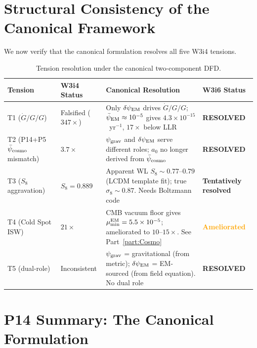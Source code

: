 \documentclass[11pt]{article}
\newcommand{\ee}[1]{\times 10^{#1}}
\newcommand{\psigrav}{\psi_{\rm grav}}
\newcommand{\dpsiEM}{\delta\psi_{\rm EM}}
\newcommand{\psicosmo}{\bar{\psi}_{\rm cosmo}}
\newcommand{\psiEM}{\bar{\psi}_{\rm EM}}
\newcommand{\Gdot}{\dot{G}/G}
\newcommand{\aM}{a_0}
\newcommand{\mumin}{\mu_{\rm min}}
\begin{document}
\section{Structural Consistency of the Canonical Framework}
\label{sec:consistency}

We now verify that the canonical formulation resolves all five W3i4 tensions.

\begin{table}[H]
\centering
\caption{Tension resolution under the canonical two-component DFD.}
\label{tab:tensions}
\begin{tabular}{llp{6cm}l}
\toprule
\textbf{Tension} & \textbf{W3i4 Status} & \textbf{Canonical Resolution} & \textbf{W3i6 Status} \\
\midrule
T1 ($\Gdot/G$) & Falsified ($347\times$) &
  Only $\dpsiEM$ drives $\Gdot/G$; $\psiEM \approx 10^{-5}$
  gives $4.3\ee{-15}$~yr$^{-1}$, $17\times$ below LLR &
  \textcolor{green!50!black}{\textbf{RESOLVED}} \\
\addlinespace
T2 (P14+P5 $\psicosmo$ mismatch) & $3.7\times$ &
  $\psigrav$ and $\dpsiEM$ serve different roles;
  $\aM$ no longer derived from $\psicosmo$ &
  \textcolor{green!50!black}{\textbf{RESOLVED}} \\
\addlinespace
T3 ($S_8$ aggravation) & $S_8 = 0.889$ &
  Apparent WL $S_8 \sim 0.77$--$0.79$ (LCDM template fit);
  true $\sigma_8 \sim 0.87$. Needs Boltzmann code &
  \textcolor{green!50!black}{\textbf{Tentatively resolved}} \\
\addlinespace
T4 (Cold Spot ISW) & $21\times$ &
  CMB vacuum floor gives $\mumin^{\rm EM} = 5.5\ee{-5}$;
  ameliorated to $10$--$15\times$. See Part~\ref{part:Cosmo} &
  \textcolor{orange}{\textbf{Ameliorated}} \\
\addlinespace
T5 (dual-role) & Inconsistent &
  $\psigrav$ = gravitational (from metric); $\dpsiEM$ = EM-sourced
  (from field equation). No dual role &
  \textcolor{green!50!black}{\textbf{RESOLVED}} \\
\bottomrule
\end{tabular}
\end{table}

\section{P14 Summary: The Canonical Formulation}
\label{sec:P14-summary}
\end{document}
